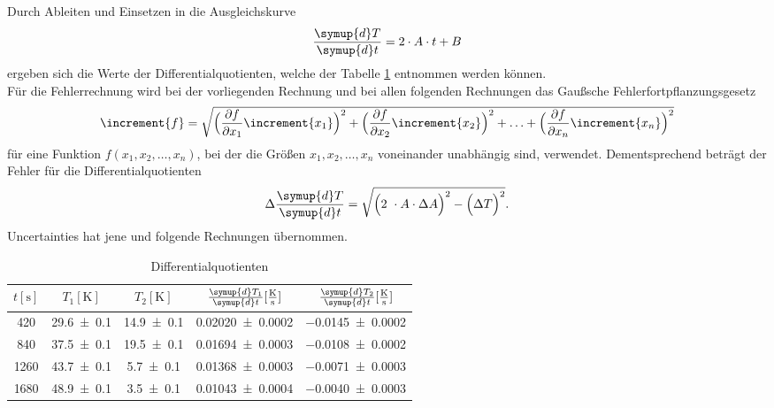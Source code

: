 Durch Ableiten und Einsetzen in die Ausgleichskurve
\begin{equation}
  \frac{\symup{d}T}{\symup{d}t}= 2 \cdot A \cdot t + B
\end{equation}
ergeben sich die Werte der Differentialquotienten, welche der Tabelle \ref{tab:tabelle1} entnommen werden können.
\\
Für die Fehlerrechnung wird bei der vorliegenden Rechnung und bei allen folgenden Rechnungen das Gaußsche Fehlerfortpflanzungsgesetz
\begin{equation}
\increment{f} = \sqrt{\Bigl(\frac{\partial f}{\partial x_1}\increment{x_1}\Bigr)^2 + \Bigl(\frac{\partial f}{\partial x_2}\increment{x_2}\Bigr)^2 + \dotsc + \Bigl(\frac{\partial f}{\partial x_n}\increment{x_n}\Bigr)^2}
\end{equation}
für eine Funktion $f(x_1,x_2, \dotsc ,x_n)$, bei der die Größen $x_1, x_2, \dotsc , x_n$ voneinander unabhängig sind, verwendet.
Dementsprechend beträgt der Fehler für die Differentialquotienten
\begin{equation}
  \Delta \frac{\symup{d}T}{\symup{d}t} = \sqrt{\Bigl(2\ \cdot A \cdot \Delta A \Bigr)^2 - \Bigl( \Delta T \Bigr)^2 }.
\end{equation}
Uncertainties hat jene und folgende Rechnungen übernommen.
\begin{table}
  \centering
  \caption{Differentialquotienten}
  \label{tab:tabelle1}
  \begin{tabular}{c c c c c}
    \toprule
    {$t [\si{\second}]$} & {$T_1 [\si{\kelvin}]$} & {$T_2 [\si{\kelvin}]$} & {$\frac{\symup{d}T_1}{\symup{d}t} [\si[per-mode=fraction]{\kelvin\per\second}]$}  & {$\frac{\symup{d}T_2}{\symup{d}t} [\si[per-mode=fraction]{\kelvin\per\second}]$}\\
    \midrule
    \num{420} & \num{29.6 +- 0.1} & \num{14.9 +- 0.1} & \num{0.02020 +- 0.0002} & \num{-0.0145 +- 0.0002} \\
    \num{840} & \num{37.5 +- 0.1} & \num{19.5 +- 0.1} & \num{0.01694 +- 0.0003} & \num{-0.0108 +- 0.0002} \\
    \num{1260} & \num{43.7 +- 0.1} & \num{5.7 +- 0.1} & \num{0.01368 +- 0.0003} & \num{-0.0071 +- 0.0003} \\
    \num{1680} & \num{48.9 +- 0.1} & \num{3.5 +- 0.1} & \num{0.01043 +- 0.0004} & \num{-0.0040 +- 0.0003} \\
    \bottomrule
  \end{tabular}
\end{table}
